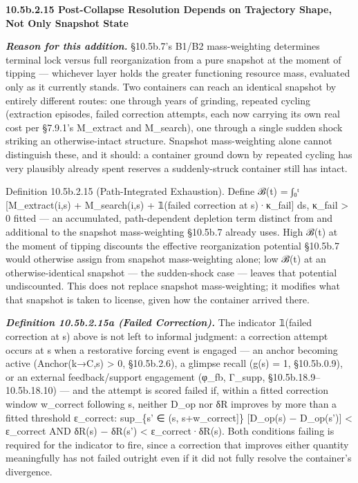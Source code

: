\documentclass[
]{article}
\begin{document}
\textbf{10.5b.2.15 Post-Collapse Resolution Depends on Trajectory Shape,
Not Only Snapshot State}

\emph{\textbf{Reason for this addition.}} §10.5b.7's B1/B2
mass-weighting determines terminal lock versus full reorganization from
a pure snapshot at the moment of tipping --- whichever layer holds the
greater functioning resource mass, evaluated only as it currently
stands. Two containers can reach an identical snapshot by entirely
different routes: one through years of grinding, repeated cycling
(extraction episodes, failed correction attempts, each now carrying its
own real cost per §7.9.1's M\_extract and M\_search), one through a
single sudden shock striking an otherwise-intact structure. Snapshot
mass-weighting alone cannot distinguish these, and it should: a
container ground down by repeated cycling has very plausibly already
spent reserves a suddenly-struck container still has intact.

Definition 10.5b.2.15 (Path-Integrated Exhaustion). Define ℬ(t) = ∫₀ᵗ
{[}M\_extract(i,s) + M\_search(i,s) + 𝟙(failed correction at
s)·κ\_fail{]} ds, κ\_fail \textgreater{} 0 fitted --- an accumulated,
path-dependent depletion term distinct from and additional to the
snapshot mass-weighting §10.5b.7 already uses. High ℬ(t) at the moment
of tipping discounts the effective reorganization potential §10.5b.7
would otherwise assign from snapshot mass-weighting alone; low ℬ(t) at
an otherwise-identical snapshot --- the sudden-shock case --- leaves
that potential undiscounted. This does not replace snapshot
mass-weighting; it modifies what that snapshot is taken to license,
given how the container arrived there.

\emph{\textbf{Definition 10.5b.2.15a (Failed Correction).}} The
indicator 𝟙(failed correction at s) above is not left to informal
judgment: a correction attempt occurs at s when a restorative forcing
event is engaged --- an anchor becoming active (Anchor(k→C,s)
\textgreater{} 0, §10.5b.2.6), a glimpse recall (g(s) = 1, §10.5b.0.9),
or an external feedback/support engagement (φ\_fb, Γ\_supp,
§10.5b.18.9--10.5b.18.10) --- and the attempt is scored failed if,
within a fitted correction window w\_correct following s, neither D\_op
nor δR improves by more than a fitted threshold ε\_correct: sup\_\{s' ∈
(s, s+w\_correct{]}\} {[}D\_op(s) − D\_op(s'){]} \textless{} ε\_correct
AND δR(s) − δR(s') \textless{} ε\_correct·δR(s). Both conditions failing
is required for the indicator to fire, since a correction that improves
either quantity meaningfully has not failed outright even if it did not
fully resolve the container's divergence.
\end{document}
